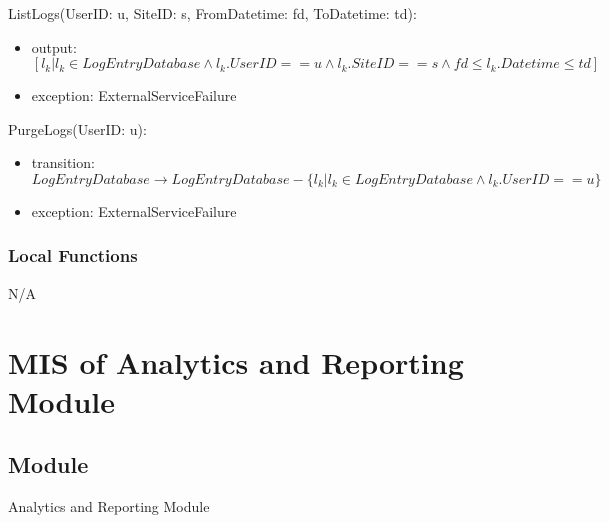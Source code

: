 \documentclass[12pt, titlepage]{article}
\begin{document}
\noindent ListLogs(UserID: u, SiteID: s, FromDatetime: fd, ToDatetime: td):
\begin{itemize}
  \item output: $[l_k | l_k \in LogEntryDatabase \land l_k.UserID ==
    u \land l_k.SiteID == s \land fd \le l_k.Datetime \le td]$
  \item exception: ExternalServiceFailure
\end{itemize}

\noindent PurgeLogs(UserID: u):
\begin{itemize}
  \item transition: $LogEntryDatabase \rightarrow LogEntryDatabase -
    \{l_k | l_k \in LogEntryDatabase \land l_k.UserID == u \}$
  \item exception: ExternalServiceFailure
\end{itemize}

\subsubsection{Local Functions}

N/A

\section{MIS of Analytics and Reporting Module}
\label{sec:AR}

\subsection{Module}
Analytics and Reporting Module
\end{document}
